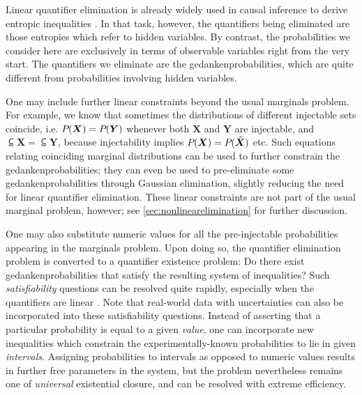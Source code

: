 Linear quantifier elimination is already widely used in causal inference to derive entropic inequalities \cite{fritz2013marginal,chaves2014novel,chaves2014informationinference}. In that task, however, the quantifiers being eliminated are those entropies which refer to hidden variables. By contrast, the probabilities we consider here are exclusively in terms of observable variables right from the very start. The quantifiers we eliminate are the gedankenprobabilities, which are quite different from probabilities involving hidden variables.

One may include further linear constraints beyond the usual marginals problem. For example, we know that sometimes the distributions of different injectable sets coincide, i.e. 
${P_{}}\lparen\bm{X}\rparen={P_{}}\lparen\bm{Y}\rparen$ whenever both $\bm{X}$ and $\bm{Y}$ are injectable, and $\subsim{\bm{X}}=\subsim{\bm{Y}}$, because injectability implies ${P_{}}\lparen\bm{X}\rparen={P_{}}\lparen\tilde{\bm{X}}\rparen$ etc. Such equations relating coinciding marginal distributions can be used to further constrain the gedankenprobabilities; they can even be used to pre-eliminate some gedankenprobabilities through Gaussian elimination, slightly reducing the need for linear quantifier elimination. These linear constraints are not part of the usual marginal problem, however; see \cref{sec:nonlinearelimination} for further discussion.

One may also substitute numeric values for all the pre-injectable probabilities appearing in the marginals problem. Upon doing so, the quantifier elimination problem is converted to a quantifier existence problem: Do there exist gedankenprobabilities that satisfy the resulting system of inequalities? Such \emph{satisfiability} questions can be resolved quite rapidly, especially when the quantifiers are linear \cite{Korovin2012ImplementingCRA,Bobot2012SimplexSAT}. Note that real-world data with uncertainties can also be incorporated into these satisfiability questions. Instead of asserting that a particular probability is equal to a given \emph{value}, one can incorporate new inequalities which constrain the experimentally-known probabilities to lie in given \emph{intervals}. Assigning probabilities to intervals as opposed to numeric values results in further free parameters in the system, but the problem nevertheless remains one of \emph{universal} existential closure, and can be resolved with extreme efficiency.

